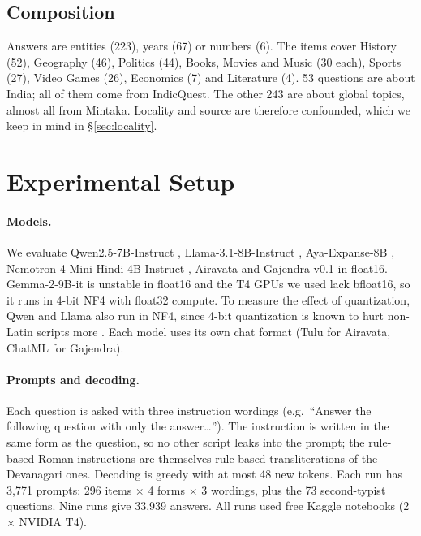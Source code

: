 \documentclass[11pt]{article}
\newcommand{\Rom}{rule-based Roman}
\begin{document}
\subsection{Composition}
Answers are entities (223), years (67) or numbers (6).
The items cover History (52), Geography (46), Politics (44), Books, Movies and Music (30 each), Sports (27), Video Games (26), Economics (7) and Literature (4).
53 questions are about India; all of them come from IndicQuest.
The other 243 are about global topics, almost all from Mintaka.
Locality and source are therefore confounded, which we keep in mind in \S\ref{sec:locality}.

\section{Experimental Setup}

\paragraph{Models.}
We evaluate Qwen2.5-7B-Instruct \citep{qwen2024qwen25}, Llama-3.1-8B-Instruct \citep{grattafiori2024llama3}, Aya-Expanse-8B \citep{dang2024aya}, Nemotron-4-Mini-Hindi-4B-Instruct \citep{joshi2024nemotronhindi}, Airavata \citep{gala2024airavata} and Gajendra-v0.1 \citep{bhabha2024gajendra} in float16.
Gemma-2-9B-it \citep{gemma2024gemma2} is unstable in float16 and the T4 GPUs we used lack bfloat16, so it runs in 4-bit NF4 \citep{dettmers2023qlora} with float32 compute.
To measure the effect of quantization, Qwen and Llama also run in NF4, since 4-bit quantization is known to hurt non-Latin scripts more \citep{marchisio2024quantization}.
Each model uses its own chat format (Tulu for Airavata, ChatML for Gajendra).

\paragraph{Prompts and decoding.}
Each question is asked with three instruction wordings (e.g.\ ``Answer the following question with only the answer\ldots'').
The instruction is written in the same form as the question, so no other script leaks into the prompt; the \Rom{} instructions are themselves rule-based transliterations of the Devanagari ones.
Decoding is greedy with at most 48 new tokens.
Each run has 3{,}771 prompts: 296 items $\times$ 4 forms $\times$ 3 wordings, plus the 73 second-typist questions.
Nine runs give 33{,}939 answers.
All runs used free Kaggle notebooks (2$\times$ NVIDIA T4).
\end{document}
